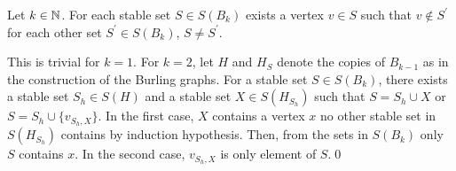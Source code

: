 \begin{lemma}\label{l1ls}
Let $k\in\mathbb{N}$. For each stable set $S\in S(B_k)$ exists a vertex $v\in S$ such that $v\notin S^\prime$ for each other set $S^\prime\in S(B_k)$, $S\neq S^\prime$.
\end{lemma}
\begin{prf}
This is trivial for $k=1$. For $k=2$, let $H$ and $H_S$ denote the copies of $B_{k-1}$ as in the construction of the Burling graphs. For a stable set $S\in S(B_k)$, there exists a stable set $S_h\in S(H)$ and a stable set $X\in S(H_{S_h})$ such that $S=S_h\cup X$ or $S=S_h\cup \{v_{S_h ,X}\}$. In the first case, $X$ contains a vertex $x$ no other stable set in $S(H_{S_h})$ contains by induction hypothesis. Then, from the sets in $S(B_k)$ only $S$ contains $x$. In the second case, $v_{S_h,X}$ is only element of $S$.\qed
\end{prf}


